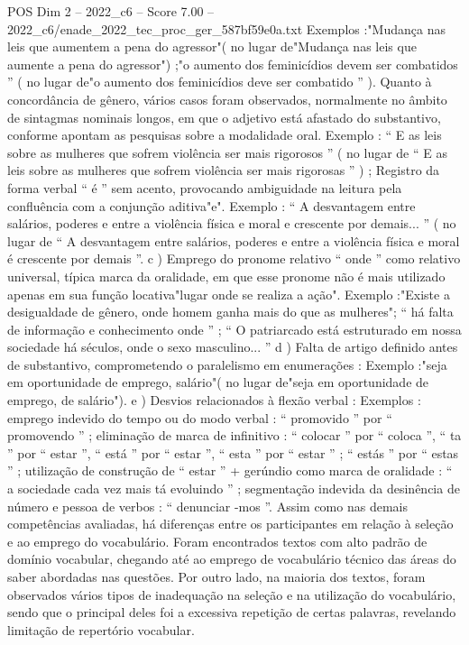 \begin{textsample}{POS Dim 2 – 2022\_c6 – Score 7.00 – 2022\_c6/enade\_2022\_tec\_proc\_ger\_587bf59e0a.txt}
Exemplos :"Mudança nas leis que aumentem a pena do agressor"( no lugar de"Mudança nas leis que aumente a pena do agressor") ;"o aumento dos feminicídios devem ser combatidos ” ( no lugar de"o aumento dos feminicídios deve ser combatido ” ).
Quanto à concordância de gênero, vários casos foram observados, normalmente no âmbito de sintagmas nominais longos, em que o adjetivo está afastado do substantivo, conforme apontam as pesquisas sobre a modalidade oral.
Exemplo : “ E as leis sobre as mulheres que sofrem violência ser mais rigorosos ” ( no lugar de “ E as leis sobre as mulheres que sofrem violência ser mais rigorosas ” ) ; Registro da forma verbal “ é ” sem acento, provocando ambiguidade na leitura pela confluência com a conjunção aditiva"e".
Exemplo : “ A desvantagem entre salários, poderes e entre a violência física e moral e crescente por demais... ” ( no lugar de “ A desvantagem entre salários, poderes e entre a violência física e moral é crescente por demais ”. c ) Emprego do pronome relativo “ onde ” como relativo universal, típica marca da oralidade, em que esse pronome não é mais utilizado apenas em sua função locativa"lugar onde se realiza a ação".
Exemplo :"Existe a desigualdade de gênero, onde homem ganha mais do que as mulheres"; “ há falta de informação e conhecimento onde ” ; “ O patriarcado está estruturado em nossa sociedade há séculos, onde o sexo masculino... ” d ) Falta de artigo definido antes de substantivo, comprometendo o paralelismo em enumerações : Exemplo :"seja em oportunidade de emprego, salário"( no lugar de"seja em oportunidade de emprego, de salário"). e ) Desvios relacionados à flexão verbal : Exemplos : emprego indevido do tempo ou do modo verbal : “ promovido ” por “ promovendo ” ; eliminação de marca de infinitivo : “ colocar ” por “ coloca ”, “ ta ” por “ estar ”, “ está ” por “ estar ”, “ esta ” por “ estar ” ; “ estás ” por “ estas ” ; utilização de construção de “ estar ” + gerúndio como marca de oralidade : “ a sociedade cada vez mais tá evoluindo ” ; segmentação indevida da desinência de número e pessoa de verbos : “ denunciar -mos ”.
Assim como nas demais competências avaliadas, há diferenças entre os participantes em relação à seleção e ao emprego do vocabulário.
Foram encontrados textos com alto padrão de domínio vocabular, chegando até ao emprego de vocabulário técnico das áreas do saber abordadas nas questões.
Por outro lado, na maioria dos textos, foram observados vários tipos de inadequação na seleção e na utilização do vocabulário, sendo que o principal deles foi a excessiva repetição de certas palavras, revelando limitação de repertório vocabular.

\end{textsample}
